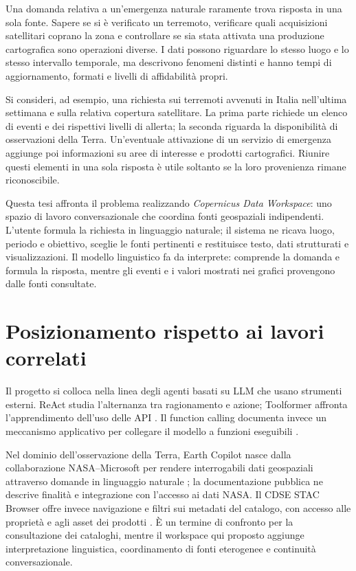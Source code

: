 Una domanda relativa a un'emergenza naturale raramente trova risposta in una
sola fonte. Sapere se si è verificato un terremoto, verificare quali acquisizioni
satellitari coprano la zona e controllare se sia stata attivata una produzione
cartografica sono operazioni diverse. I dati possono riguardare lo stesso luogo
e lo stesso intervallo temporale, ma descrivono fenomeni distinti e hanno tempi
di aggiornamento, formati e livelli di affidabilità propri.

Si consideri, ad esempio, una richiesta sui terremoti avvenuti in Italia
nell'ultima settimana e sulla relativa copertura satellitare. La prima parte
richiede un elenco di eventi e dei rispettivi livelli di allerta; la seconda
riguarda la disponibilità di osservazioni della Terra. Un'eventuale attivazione
di un servizio di emergenza aggiunge poi informazioni su aree di interesse e
prodotti cartografici. Riunire questi elementi in una sola risposta è utile
soltanto se la loro provenienza rimane riconoscibile.

Questa tesi affronta il problema realizzando \emph{Copernicus Data Workspace}:
uno spazio di lavoro conversazionale che coordina fonti geospaziali indipendenti.
L'utente formula la richiesta in linguaggio naturale; il sistema ne ricava
luogo, periodo e obiettivo, sceglie le fonti pertinenti e restituisce testo,
dati strutturati e visualizzazioni. Il modello linguistico fa da interprete:
comprende la domanda e formula la risposta, mentre gli eventi e i valori
mostrati nei grafici provengono dalle fonti consultate.

\section{Posizionamento rispetto ai lavori correlati}

Il progetto si colloca nella linea degli agenti basati su LLM che usano
strumenti esterni. ReAct studia l'alternanza tra ragionamento e azione;
Toolformer affronta l'apprendimento dell'uso delle API
\cite{yaoReAct,schickToolformer}. Il function calling documenta invece un
meccanismo applicativo per collegare il modello a funzioni eseguibili
\cite{openaiFunctionCalling}.

Nel dominio dell'osservazione della Terra, Earth Copilot nasce dalla
collaborazione NASA--Microsoft per rendere interrogabili dati geospaziali
attraverso domande in linguaggio naturale \cite{earthCopilot2024}; la
documentazione pubblica ne descrive finalità e integrazione con l'accesso ai
dati NASA. Il CDSE STAC Browser offre invece navigazione e filtri sui metadati
del catalogo, con accesso alle proprietà e agli asset dei prodotti
\cite{cdseStac}. È un termine di confronto per la consultazione dei cataloghi,
mentre il workspace qui proposto aggiunge interpretazione linguistica,
coordinamento di fonti eterogenee e continuità conversazionale.


